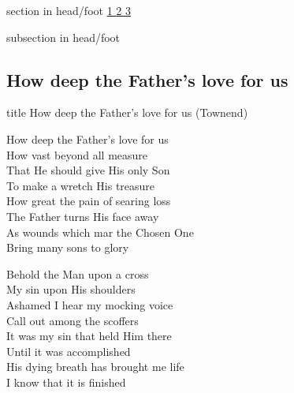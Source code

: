 \documentclass[aspectratio=169]{beamer}
\begin{document}
{
{ 
 {
 \begin{beamercolorbox}[ht=4.5ex,dp=1.5ex,%
      leftskip=.3cm,rightskip=.3cm plus1fil]{section in head/foot}
 \fontsize{12}{25}\selectfont 
\hyperlink{How deep the Father's love for us[](Townend)1}{1  }\hyperlink{How deep the Father's love for us[](Townend)2}{2  }\hyperlink{How deep the Father's love for us[](Townend)3}{3  } 
 \end{beamercolorbox}%
  \begin{beamercolorbox}[ht=2.5ex,dp=1.125ex,%
   leftskip=.3cm,rightskip=.3cm plus1fil]{subsection in head/foot}
   \insertauthor
 \end{beamercolorbox}%
 }
}
\subsection{How deep the Father's love for us}
\hypertarget{How deep the Father's love for us[](Townend)}{}
\begin{frame}{}
 \vfill
  \centering
  \begin{beamercolorbox}[sep=8pt,center,shadow=true,rounded=true]{title}
    How deep the Father's love for us (Townend)    
  \end{beamercolorbox}
  \vfill
\end{frame}

\hypertarget{How deep the Father's love for us[](Townend)1}{}
\begin{frame}{}
\fontsize{18.75}{22.5}\selectfont

How deep the Father's love for us\\ 
How vast beyond all measure\\ 
That He should give His only Son\\ 
To make a wretch His treasure\\ 
How great the pain of searing loss\\ 
The Father turns His face away\\ 
As wounds which mar the Chosen One\\ 
Bring many sons to glory

\end{frame}
\hypertarget{How deep the Father's love for us[](Townend)2}{}
\begin{frame}{}
\fontsize{18.75}{22.5}\selectfont

Behold the Man upon a cross\\ 
My sin upon His shoulders\\ 
Ashamed I hear my mocking voice\\ 
Call out among the scoffers\\ 
It was my sin that held Him there\\ 
Until it was accomplished\\ 
His dying breath has brought me life\\ 
I know that it is finished


\end{frame}}
\end{document}
